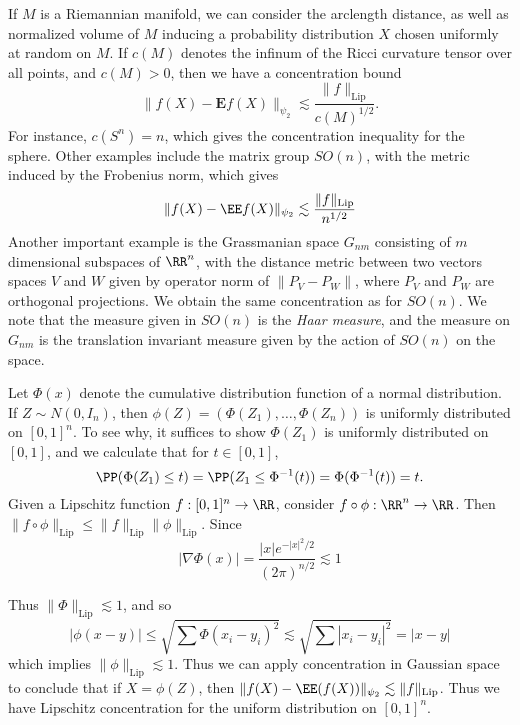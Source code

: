 \begin{example}
    If $M$ is a Riemannian manifold, we can consider the arclength distance, as well as normalized volume of $M$ inducing a probability distribution $X$ chosen uniformly at random on $M$. If $c(M)$ denotes the infinum of the Ricci curvature tensor over all points, and $c(M) > 0$, then we have a concentration bound
    \[ \| f(X) - \mathbf{E} f(X) \|_{\psi_2} \lesssim \frac{\| f \|_{\text{Lip}}}{c(M)^{1/2}}. \]
    For instance, $c(S^n) = n$, which gives the concentration inequality for the sphere. Other examples include the matrix group $SO(n)$, with the metric induced by the Frobenius norm, which gives
    \[ \| f(X) - \EE f(X) \|_{\psi_2} \lesssim \frac{\| f \|_{\text{Lip}}}{n^{1/2}} \]
    Another important example is the Grassmanian space $G_{nm}$ consisting of $m$ dimensional subspaces of $\RR^n$, with the distance metric between two vectors spaces $V$ and $W$ given by operator norm of $\| P_V - P_W \|$, where $P_V$ and $P_W$ are orthogonal projections. We obtain the same concentration as for $SO(n)$. We note that the measure given in $SO(n)$ is the {\it Haar measure}, and the measure on $G_{nm}$ is the translation invariant measure given by the action of $SO(n)$ on the space.
\end{example}

\begin{example}
    Let $\Phi(x)$ denote the cumulative distribution function of a normal distribution. If $Z \sim N(0,I_n)$, then $\phi(Z) = (\Phi(Z_1), \dots, \Phi(Z_n))$ is uniformly distributed on $[0,1]^n$. To see why, it suffices to show $\Phi(Z_1)$ is uniformly distributed on $[0,1]$, and we calculate that for $t \in [0,1]$,
    \[ \PP(\Phi(Z_1) \leq t) = \PP(Z_1 \leq \Phi^{-1}(t)) = \Phi(\Phi^{-1}(t)) = t. \]
    Given a Lipschitz function $f: [0,1]^n \to \RR$, consider $f \circ \phi: \RR^n \to \RR$. Then $\| f \circ \phi \|_{\text{Lip}} \leq \| f \|_{\text{Lip}} \| \phi \|_{\text{Lip}}$. Since
    \[ | \nabla \Phi(x)| = \frac{|x| e^{-|x|^2/2}}{(2\pi)^{n/2}} \lesssim 1 \]

    Thus $\| \Phi \|_{\text{Lip}} \lesssim 1$, and so
    \[ |\phi(x-y)| \leq \sqrt{ \sum \Phi(x_i - y_i)^2 } \lesssim \sqrt{ \sum |x_i - y_i|^2 } = |x - y| \]
    which implies $\| \phi \|_{\text{Lip}} \lesssim 1$. Thus we can apply concentration in Gaussian space to conclude that if $X = \phi(Z)$, then $\| f(X) - \EE(f(X)) \|_{\psi_2} \lesssim \| f \|_{\text{Lip}}$. Thus we have Lipschitz concentration for the uniform distribution on $[0,1]^n$.
\end{example}

